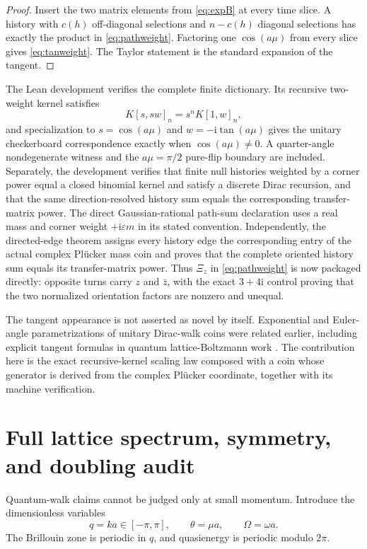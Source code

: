 \documentclass[11pt]{article}
\newcommand{\ii}{\mathrm{i}}
\begin{document}
\begin{proof}
Insert the two matrix elements from \eqref{eq:expB} at every time slice.  A
history with $c(h)$ off-diagonal selections and $n-c(h)$ diagonal selections
has exactly the product in \eqref{eq:pathweight}.  Factoring one
$\cos(a\mu)$ from every slice gives \eqref{eq:tanweight}.  The Taylor statement
is the standard expansion of the tangent.
\end{proof}

The Lean development verifies the complete finite dictionary.  Its recursive
two-weight kernel satisfies
\[
 K[s,sw]_n=s^nK[1,w]_n,
\]
and specialization to $s=\cos(a\mu)$ and
$w=-\ii\tan(a\mu)$ gives the unitary checkerboard correspondence exactly when
$\cos(a\mu)\neq0$.  A quarter-angle nondegenerate witness and the
$a\mu=\pi/2$ pure-flip boundary are included.  Separately, the development
verifies that finite null histories weighted by a corner power equal a closed
binomial kernel and satisfy a discrete Dirac recursion, and that the same
direction-resolved history sum equals the corresponding transfer-matrix power.
The direct Gaussian-rational path-sum declaration uses a real mass and corner
weight $+\ii\varepsilon m$ in its stated convention.  Independently, the
directed-edge theorem assigns every history edge the corresponding entry of
the actual complex Pl\"ucker mass coin and proves that the complete oriented
history sum equals its transfer-matrix power.  Thus $\Xi_z$ in
\eqref{eq:pathweight} is now packaged directly: opposite turns carry $z$ and
$\bar z$, with the exact $3+4\ii$ control proving that the two normalized
orientation factors are nonzero and unequal.

The tangent appearance is not asserted as novel by itself.  Exponential and
Euler-angle parametrizations of unitary Dirac-walk coins were related earlier,
including explicit tangent formulas in quantum lattice-Boltzmann work
\cite{SucciQW}.  The contribution here is the exact recursive-kernel scaling
law composed with a coin whose generator is derived from the complex Pl\"ucker
coordinate, together with its machine verification.

\section{Full lattice spectrum, symmetry, and doubling audit}
\label{sec:spectrum}

Quantum-walk claims cannot be judged only at small momentum.  Introduce the
dimensionless variables
\[
 q=ka\in[-\pi,\pi],
 \qquad
 \theta=\mu a,
 \qquad
 \Omega=\omega a.
\]
The Brillouin zone is periodic in $q$, and quasienergy is periodic modulo
$2\pi$.
\end{document}
